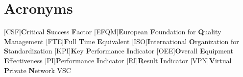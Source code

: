 \pagestyle{plain}
{}
\listoffigures
\label{sec:Figures}

\newpage

\section*{Acronyms}
\label{sec:Acronym}

\begin{acronym}[EFQM]
	[CSF]{\textbf{C}ritical \textbf{S}uccess \textbf{F}actor}
	[EFQM]{\textbf{E}uropean \textbf{F}oundation for \textbf{Q}uality \textbf{M}anagement}
	[FTE]{\textbf{F}ull \textbf{T}ime \textbf{E}quivalent}
	[ISO]{\textbf{I}nternational \textbf{O}rganization for \textbf{S}tandardization}
	[KPI]{\textbf{K}ey \textbf{P}erformance \textbf{I}ndicator}
	[OEE]{\textbf{O}verall \textbf{E}quipment \textbf{E}ffectiveness}
	[PI]{\textbf{P}erformance \textbf{I}ndicator}
	[RI]{\textbf{R}esult \textbf{I}ndicator}
	[VPN]{\textbf{V}irtual \textbf{P}rivate \textbf{N}etwork}
	VSC
\end{acronym}
